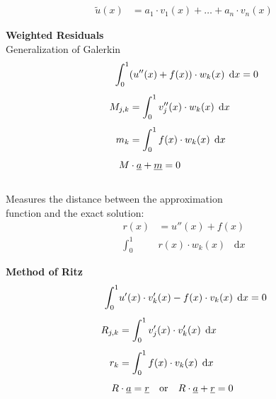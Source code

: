 \documentclass[
final,
a4paper,
oneside,
parskip=full,
headings=standardclasses,
headings=big,
pointednumbers,
fleqn
]{scrartcl}
\newcommand*\difx{\; \mathop{}\!\mathrm{d}x}
\newcommand{\kl}[1]{{\left( #1 \right)}}
\begin{document}
    
    {\setlength{\abovedisplayskip}{-6pt}
    \setlength{\belowdisplayskip}{-12pt}
    \begin{align*}
        \widetilde{u}\kl{x} & = a_1 \cdot v_1\kl{x} + \ldots + a_n \cdot v_n\kl{x}
    \end{align*}}

    {\bf{Weighted Residuals}} \\
    Generalization of Galerkin \\
    {\setlength{\abovedisplayskip}{-6pt}
    \setlength{\belowdisplayskip}{-12pt}
    \begin{align*}
        \int_{0}^{1}&{\kl{u''\kl{x} + f\kl{x}} \cdot w_k\kl{x} \difx} = 0  \\[0.15cm]
        M_{j,k} & = \int_{0}^{1}{v_j''\kl{x} \cdot w_k\kl{x} \difx}  \\[0.15cm]
        m_k & = \int_{0}^{1}{f\kl{x} \cdot w_k\kl{x} \difx}   \\[0.15cm]
        M &\cdot \uline{a} + \uline{m} = 0
    \end{align*}} \\
    Measures the distance between the approximation\\
    function and the exact solution: \\
    {\setlength{\abovedisplayskip}{-6pt}
    \setlength{\belowdisplayskip}{-12pt}
    \begin{align*}
        r\kl{x} & = u''\kl{x} + f\kl{x} \\[0.15cm]
        \int_{0}^{1}&{r\kl{x} \cdot w_k\kl{x} \difx}
    \end{align*}}
    
    {\bf{Method of Ritz}} \\
    {\setlength{\abovedisplayskip}{-6pt}
    \setlength{\belowdisplayskip}{-12pt}
    \begin{align*}
        \int_{0}^{1}&{u'\kl{x} \cdot v_k'\kl{x} - f\kl{x} \cdot v_k\kl{x} \difx} = 0  \\[0.15cm]
        R_{j,k} & = \int_{0}^{1}{v_j'\kl{x} \cdot v_k'\kl{x} \difx}  \\[0.15cm]
        r_k &= \int_{0}^{1}{f\kl{x} \cdot v_k\kl{x} \difx}   \\[0.15cm]
        R &\cdot \uline{a} = \uline{r} \quad \text{or} \quad R \cdot \uline{a} + \uline{r} = 0
    \end{align*}}
\end{document}
